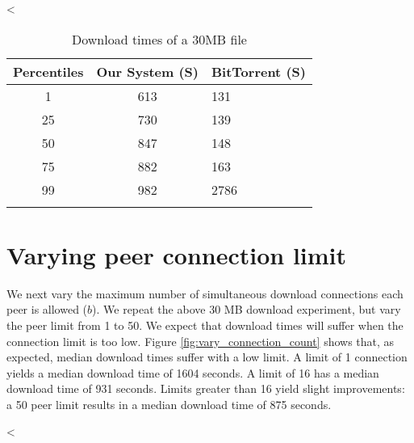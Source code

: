 <%

\begin{table}
  \caption{Download times of a 30MB file}
\begin{center}
\begin{tabular}{ c c l }
  Percentiles & Our System (S) & BitTorrent (S) \\
  \hline
  1 & 613 & 131 \\
  25 & 730 & 139 \\
  50 & 847 & 148 \\
  75 & 882 & 163 \\
  99 & 982 & 2786 \\
  \label{fig:yanc_vs_bt}
\end{tabular}
\end{center}
\end{table}

\section{Varying peer connection limit} 

We next vary the maximum number of simultaneous download connections each peer is allowed ($b$). We 
repeat the above 30 MB download experiment, but vary the peer limit from 1 to 50. 
We expect that download times will suffer when the connection limit is too low. Figure \ref{fig:vary_connection_count} shows that, as expected, median 
download times suffer with a low limit.  A limit of 1 connection yields a median download time of 1604 seconds.  A limit of 16 has a median download time of 931 seconds.  Limits greater than 16 yield
slight improvements: a 50 peer limit results in a median download time of 875 seconds.

<%
